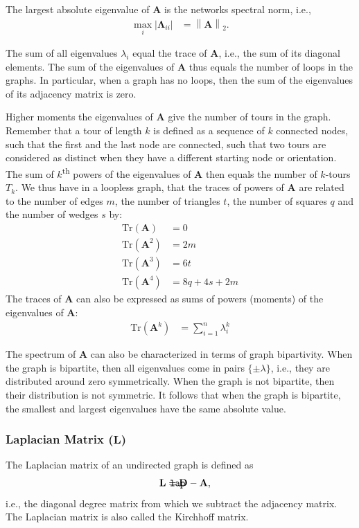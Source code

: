 \documentclass{article}
\def\mathnote#1{%
  \tag*{\rlap{\hspace\marginparsep\smash{\parbox[t]{\marginparwidth}{#1}}}}
}
\begin{document}
The largest absolute eigenvalue of $\mathbf A$ is the networks spectral norm,
i.e.,
\begin{align*}
  \max_i |\mathbf \Lambda_{ii}| &= \left\| \mathbf A \right\|_2.
\end{align*}

The sum of all eigenvalues $\lambda_i$ equal the trace of $\mathbf A$,
i.e., the sum of its diagonal elements.  The sum of the eigenvalues of
$\mathbf A$ thus equals the number of loops in the graphs. 
In particular, when a graph
has no loops, then the sum of the eigenvalues of its adjacency matrix is
zero.  

Higher moments the eigenvalues of $\mathbf A$ give the number of tours
in the graph.  Remember that a tour of length $k$ is defined as a
sequence of $k$ connected nodes, such that the first and the last node
are connected, such that two tours are considered as distinct when they
have a different starting node or orientation. 
The sum of $k$\textsuperscript{th} powers of the
eigenvalues of $\mathbf A$ then equals the number of $k$-tours $T_k$. 
We thus have in a loopless graph, that the traces of powers of $\mathbf
A$ are related to the number of edges $m$, the number of triangles $t$,
the number of squares $q$ and the number of wedges $s$ by:
\begin{align*}
  \mathrm{Tr}(\mathbf A) &= 0 \\
  \mathrm{Tr}(\mathbf A^2) &= 2m \\
  \mathrm{Tr}(\mathbf A^3) &= 6t \\
  \mathrm{Tr}(\mathbf A^4) &= 8q + 4s + 2m
\end{align*}
The traces of $\mathbf A$ can also be expressed as sums of powers
(moments) of the eigenvalues of $\mathbf A$:
\begin{align*}
  \mathrm{Tr}(\mathbf A^k) &= \sum_{i=1}^n \lambda_i^k
\end{align*}

The spectrum of $\mathbf A$ can also be characterized in terms of graph
bipartivity.  When the graph is bipartite, then all eigenvalues come in
pairs $\{\pm\lambda\}$, i.e., they are distributed around zero
symmetrically.  When the graph is not bipartite, then their distribution
is not symmetric.  It follows that when the graph is bipartite, the
smallest and largest eigenvalues have the same absolute value. 

\subsubsection{Laplacian Matrix ($\mathbf L$)}
The Laplacian matrix of an undirected graph is defined as
\begin{align*}
  \mathnote{\texttt{lap}}
  \mathbf L &= \mathbf D - \mathbf A,
\end{align*}
i.e., the diagonal degree matrix from which we subtract the adjacency
matrix.  The Laplacian matrix is also called the Kirchhoff matrix. 
\end{document}
